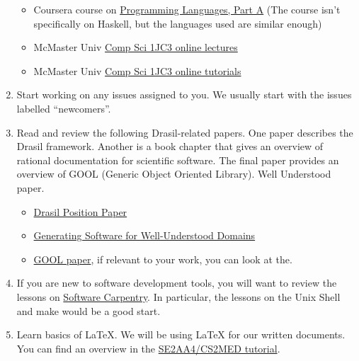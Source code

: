 \documentclass[12pt]{article}
\begin{document}
\begin{enumerate}
\begin{itemize}
\item Coursera course on
\href{https://www.coursera.org/learn/programming-languages} {Programming
Languages, Part A} (The course isn't specifically on Haskell, but the languages
used are similar enough)

\item McMaster Univ
\href{https://www.youtube.com/watch?v=eGwR_MiIT_A&list=PLknslYp7IpnJYHyJd02cOsp0ZBKxWBXK9}
{Comp Sci 1JC3 online lectures} 

\item McMaster Univ
\href{https://www.youtube.com/watch?v=7WxbuAztuFs&list=PLHRF-X-NtQR4MZBvm05NshPIEI8ELID5m}
{Comp Sci 1JC3 online tutorials} 

\end{itemize}

\item Start working on any issues assigned to you.  We usually start with the
issues labelled ``newcomers''.

\item Read and review the following Drasil-related papers.  One paper describes
the Drasil framework.  Another is a book chapter that gives an overview of
rational documentation for scientific software.  The final paper provides an
overview of GOOL (Generic Object Oriented Library).  Well Understood paper.

\begin{itemize}

\item
\href{https://gitlab.cas.mcmaster.ca/smiths/pub/-/blob/master/SzymczakEtAl2016.pdf}
{Drasil Position Paper} 

\item \href{https://arxiv.org/abs/2302.00740} {Generating Software for
Well-Understood Domains}

\item \href{https://arxiv.org/abs/1911.11824 } {GOOL paper}, if relevant to
your work, you can look at the.

\end{itemize}

\item If you are new to software development tools, you will want to review the
lessons on \href{http://software-carpentry.org/lessons/} {Software Carpentry}.
In particular, the lessons on the Unix Shell and make would be a good start.

\item Learn basics of LaTeX.  We will be using LaTeX for our written documents.
You can find an overview in the
\href{https://gitlab.cas.mcmaster.ca/smiths/se2aa4_cs2me3/-/tree/master/Tutorials\%2FT02a-LaTeX}
{SE2AA4/CS2MED tutorial}.

\end{enumerate}
\end{document}

